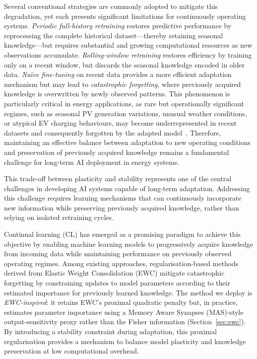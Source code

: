 \documentclass[journal]{IEEEtran}
\begin{document}
Several conventional strategies are commonly adopted to mitigate this degradation, yet each presents significant limitations for continuously operating systems. \emph{Periodic full-history retraining} restores predictive performance by reprocessing the complete historical dataset---thereby retaining seasonal knowledge---but requires substantial and growing computational resources as new observations accumulate. \emph{Rolling-window retraining} restores efficiency by training only on a recent window, but discards the seasonal knowledge encoded in older data. \emph{Na\"ive fine-tuning} on recent data provides a more efficient adaptation mechanism but may lead to \emph{catastrophic forgetting}, where previously acquired knowledge is overwritten by newly observed patterns. This phenomenon is particularly critical in energy applications, as rare but operationally significant regimes, such as seasonal PV generation variations, unusual weather conditions, or atypical EV charging behaviours, may become underrepresented in recent datasets and consequently forgotten by the adapted model~\cite{mccloskey1989catastrophic,french1999catastrophic}. Therefore, maintaining an effective balance between adaptation to new operating conditions and preservation of previously acquired knowledge remains a fundamental challenge for long-term AI deployment in energy systems.

This trade-off between plasticity and stability represents one of the central challenges in developing AI systems capable of long-term adaptation. Addressing this challenge requires learning mechanisms that can continuously incorporate new information while preserving previously acquired knowledge, rather than relying on isolated retraining cycles.

Continual learning (CL) has emerged as a promising paradigm to achieve this objective by enabling machine learning models to progressively acquire knowledge from incoming data while maintaining performance on previously observed operating regimes. Among existing approaches, regularisation-based methods derived from Elastic Weight Consolidation (EWC) mitigate catastrophic forgetting by constraining updates to model parameters according to their estimated importance for previously learned knowledge. The method we deploy is \emph{EWC-inspired}: it retains EWC's proximal quadratic penalty but, in practice, estimates parameter importance using a Memory Aware Synapses (MAS)-style output-sensitivity proxy rather than the Fisher information (Section~\ref{sec:ewc}). By introducing a stability constraint during adaptation, this proximal regularisation provides a mechanism to balance model plasticity and knowledge preservation at low computational overhead.
\end{document}
